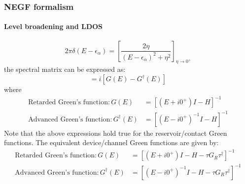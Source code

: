 \documentclass{beamer}
\begin{document}
{
    \begin{frame}

        \frametitle{NEGF formalism}
        \framesubtitle{Level broadening and LDOS}
        \scriptsize

\vspace{18pt}

\begin{equation*}
    2\pi \delta(E-\epsilon_{\alpha}) = \left[\frac{2\eta}{(E-\epsilon_{\alpha})^{2}+\eta^{2}} \right]_{\eta \rightarrow 0^+}
\end{equation*}
the spectral matrix can be expressed as:
\begin{equation*}
    [A(E)] = i[G(E)-G^{\dagger}(E)]
\end{equation*}
where 
\begin{align*}
    \text{Retarded Green's function}: G(E) &= [(E+i0^{+})I-H]^{-1} \\
    \text{Advanced Green's function}: G^{\dagger}(E) &= [(E-i0^{+})^{-1}I-H]^{-1}
\end{align*}
Note that the above expressions hold true for the reservoir/contact Green functions. The equivalent device/channel Green functions are given by:
\begin{align*}
    \text{Retarded Green's function}: G(E) &= [(E+i0^{+})I-H-\tau G_{R} \tau^{\dagger}]^{-1} \\
    \text{Advanced Green's function}: G^{\dagger}(E) &= [(E-i0^{+})^{-1}I-H-\tau G_{R} \tau^{\dagger}]^{-1}
\end{align*}

    \end{frame}
}
\end{document}
